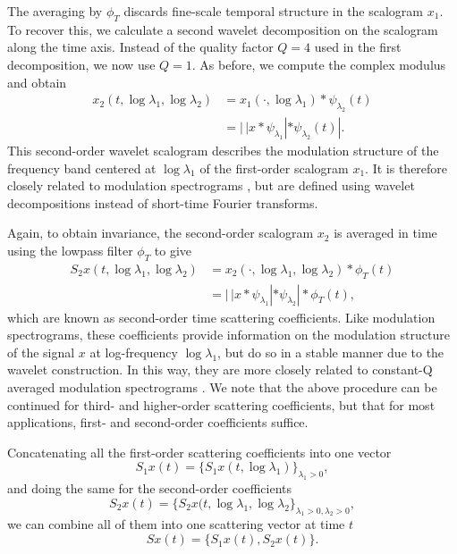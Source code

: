 \documentclass{article}
\newcommand{\lau}{{\lambda_1}}
\newcommand{\lad}{{\lambda_2}}
\begin{document}
\begin{sloppy}
The averaging by $\phi_T$ discards fine-scale temporal structure in the scalogram $x_1$. To recover this, we calculate a second wavelet decomposition on the scalogram along the time axis. Instead of the quality factor $Q = 4$ used in the first decomposition, we now use $Q = 1$. As before, we compute the complex modulus and obtain
\begin{align}
	\nonumber
	x_2(t, \log \lau, \log \lad) &= x_1(\cdot, \log \lau) \ast \psi_\lad(t) \\
	&= |\,| x \ast \psi_\lau | \ast \psi_\lad (t) |.
\end{align}
This second-order wavelet scalogram describes the modulation structure of the frequency band centered at $\log \lau$ of the first-order scalogram $x_1$. It is therefore closely related to modulation spectrograms \cite{atlas}, but are defined using wavelet decompositions instead of short-time Fourier transforms.

Again, to obtain invariance, the second-order scalogram $x_2$ is averaged in time using the lowpass filter $\phi_T$ to give
\begin{align}
	\nonumber
	S_2 x(t, \log \lau, \log \lad) &= x_2(\cdot, \log \lau, \log \lad) \ast \phi_T(t) \\
	&= |\,| x \ast \psi_\lau | \ast \psi_\lad | \ast \phi_T(t),
\end{align}
which are known as second-order time scattering coefficients. Like modulation spectrograms, these coefficients provide information on the modulation structure of the signal $x$ at log-frequency $\log \lau$, but do so in a stable manner due to the wavelet construction. In this way, they are more closely related to constant-Q averaged modulation spectrograms \cite{ellis-mcdermott}. We note that the above procedure can be continued for third- and higher-order scattering coefficients, but that for most applications, first- and second-order coefficients suffice.

Concatenating all the first-order scattering coefficients into one vector
\begin{equation}
	S_1x(t) = \{S_1x(t, \log \lau)\}_{\lau>0},
\end{equation}
and doing the same for the second-order coefficients
\begin{equation}
	S_2x(t) = \{S_2x(t, \log \lau, \log \lad\}_{\lau>0, \lad>0},
\end{equation}
we can combine all of them into one scattering vector at time $t$
\begin{equation}
	Sx(t) = \{S_1x(t), S_2x(t)\}.
\end{equation}


\end{sloppy}
\end{document}
